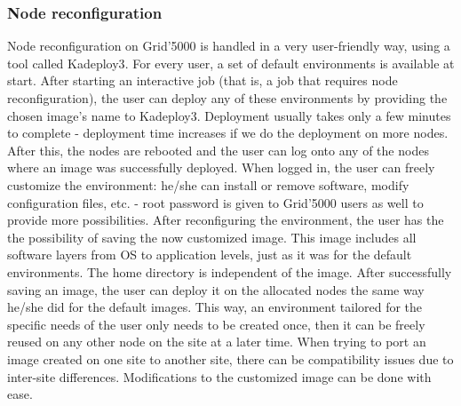 \subsubsection{Node reconfiguration}
Node reconfiguration on Grid'5000 is handled in a very user-friendly
way, using a tool called Kadeploy3\cite{jsn13}. For every user, a set
of default environments is available at start. After starting an
interactive job (that is, a job that requires node reconfiguration),
the user can deploy any of these environments by providing the chosen
image's name to Kadeploy3. Deployment usually takes only a few minutes
to complete - deployment time increases if we do the deployment on
more nodes. After this, the nodes are rebooted and the user can log
onto any of the nodes where an image was successfully deployed. When
logged in, the user can freely customize the environment: he/she can
install or remove software, modify configuration files, etc. - root
password is given to Grid'5000 users as well to provide more
possibilities. After reconfiguring the environment, the user has the
the possibility of saving the now customized image. This image
includes all software layers from OS to application levels, just as it
was for the default environments. The home directory is independent of
the image. After successfully saving an image, the user can deploy it
on the allocated nodes the same way he/she did for the default
images. This way, an environment tailored for the specific needs of
the user only needs to be created once, then it can be freely reused
on any other node on the site at a later time. When trying to port an
image created on one site to another site, there can be compatibility
issues due to inter-site differences. Modifications to the customized
image can be done with ease.
